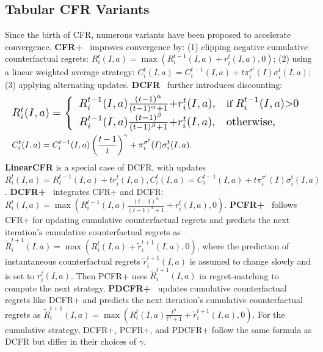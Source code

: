 \documentclass[letterpaper]{article} %
\makeatletter
\renewenvironment{align*}{%
  \linenomath 
  \start@align\@ne\st@rredtrue\m@ne
}{%
  \endalign
  \endlinenomath 
}
\makeatother
\begin{document}
\subsection{Tabular CFR Variants}
Since the birth of CFR, numerous variants have been proposed to accelerate convergence. 
\textbf{CFR+}~\cite{tammelin_solving_2014,bowling_heads-up_2015} improves convergence by: (1) clipping negative cumulative counterfactual regrets: $R^t_i(I, a) = \max(R_i^{t-1}(I, a) + r_i^t(I, a), 0)$; (2) using a linear weighted average strategy: $C^t_i(I, a) = C_i^{t-1}(I, a) + t\pi_i^{\sigma^t}(I)\sigma_i^t(I, a)$; (3) applying alternating updates.
\textbf{DCFR}~\cite{brown_solving_2019} further introduces discounting:
\begin{align*}
	&\resizebox{1\linewidth}{!}{$
    R_i^{t}(I, a) = \left\{\begin{array}{cl}
		R_i^{t\small{-}1}(I, a)\frac{(t\small{-}1)^\alpha}{(t\small{-}1)^{\alpha}\small{+}1}\small{+}r^{t}_i(I, a), & \text{\small{if}} \;R_i^{t\small{-}1}(I, a) \small{>} 0 \\
		R_i^{t\small{-}1}(I, a)\frac{(t\small{-}1)^\beta}{(t\small{-}1)^{\beta}\small{+}1} \small{+} r_i^{t}(I, a), & \text{otherwise,}
	\end{array}\right.
    $}\\
	&C_i^t(I, a) = C_i^{t-1}(I, a) \left(\frac{t-1}{t}\right)^\gamma+\pi_i^{\sigma^t}(I)\sigma^t_i(I, a).
\end{align*}
\textbf{LinearCFR} is a special case of DCFR, with updates $R^t_i(I, a) = R_i^{t-1}(I, a) + tr_i^t(I, a), C^t_i(I, a) = C_i^{t-1}(I, a) + t\pi_i^{\sigma^t}(I)\sigma_i^t(I, a)$.
\textbf{DCFR+}~\cite{AutoCFR,PDCFRPlus} integrates CFR+ and DCFR: $R_i^t(I, a) = \max\left(R_i^{t-1}(I, a) \frac{(t-1)^\alpha}{(t-1)^\alpha + 1} + r_i^t(I,a), 0\right)$. \textbf{PCFR+}~\cite{farina2021faster} follows CFR+ for updating cumulative counterfactual regrets and predicts the next iteration's cumulative counterfactual regrets as $\widetilde{R}_i^{t+1}(I, a) = \max(R_i^t(I, a) + \widetilde{r}_i^{t+1}(I, a), 0)$, where the prediction of instantaneous counterfactual regrets $\tilde{r}_i^{t+1}(I, a)$ is assumed to change slowly and is set to $r_i^t(I, a)$. Then PCFR+ uses $\tilde{R}_i^{t+1}(I, a)$ in regret-matching to compute the next strategy. \textbf{PDCFR+}~\cite{PDCFRPlus} updates cumulative counterfactual regrets like DCFR+ and predicts the next iteration's cumulative counterfactual regrets as $\widetilde{R}_i^{t+1}(I, a) = \max(R_i^t(I, a)\frac{t^\alpha}{t^\alpha + 1} + \widetilde{r}_i^{t+1}(I, a), 0)$. For the cumulative strategy, DCFR+, PCFR+, and PDCFR+ follow the same formula as DCFR but differ in their choices of $\gamma$. 
\end{document}
